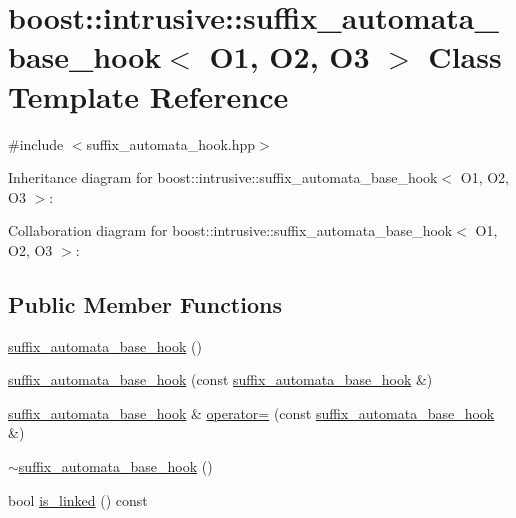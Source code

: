 \hypertarget{classboost_1_1intrusive_1_1suffix__automata__base__hook}{}\section{boost\+:\+:intrusive\+:\+:suffix\+\_\+automata\+\_\+base\+\_\+hook$<$ O1, O2, O3 $>$ Class Template Reference}
\label{classboost_1_1intrusive_1_1suffix__automata__base__hook}


{\ttfamily \#include $<$suffix\+\_\+automata\+\_\+hook.\+hpp$>$}



Inheritance diagram for boost\+:\+:intrusive\+:\+:suffix\+\_\+automata\+\_\+base\+\_\+hook$<$ O1, O2, O3 $>$\+:


Collaboration diagram for boost\+:\+:intrusive\+:\+:suffix\+\_\+automata\+\_\+base\+\_\+hook$<$ O1, O2, O3 $>$\+:
\subsection*{Public Member Functions}
\begin{DoxyCompactItemize}
\item 
\hyperlink{classboost_1_1intrusive_1_1suffix__automata__base__hook_a6bcc7ac193ed9d2aa4fffa4f5a5ec20e}{suffix\+\_\+automata\+\_\+base\+\_\+hook} ()
\item 
\hyperlink{classboost_1_1intrusive_1_1suffix__automata__base__hook_a606c87a36eaf753af10d9809c6014ead}{suffix\+\_\+automata\+\_\+base\+\_\+hook} (const \hyperlink{classboost_1_1intrusive_1_1suffix__automata__base__hook}{suffix\+\_\+automata\+\_\+base\+\_\+hook} \&)
\item 
\hyperlink{classboost_1_1intrusive_1_1suffix__automata__base__hook}{suffix\+\_\+automata\+\_\+base\+\_\+hook} \& \hyperlink{classboost_1_1intrusive_1_1suffix__automata__base__hook_a5d52d6dc1f73d4df70df3eba344429e3}{operator=} (const \hyperlink{classboost_1_1intrusive_1_1suffix__automata__base__hook}{suffix\+\_\+automata\+\_\+base\+\_\+hook} \&)
\item 
\hyperlink{classboost_1_1intrusive_1_1suffix__automata__base__hook_ae5bb92cac33b7648f6b3a152de04c54e}{$\sim$suffix\+\_\+automata\+\_\+base\+\_\+hook} ()
\item 
bool \hyperlink{classboost_1_1intrusive_1_1suffix__automata__base__hook_a4ea824934793a699459376ee845484f6}{is\+\_\+linked} () const
\end{DoxyCompactItemize}


